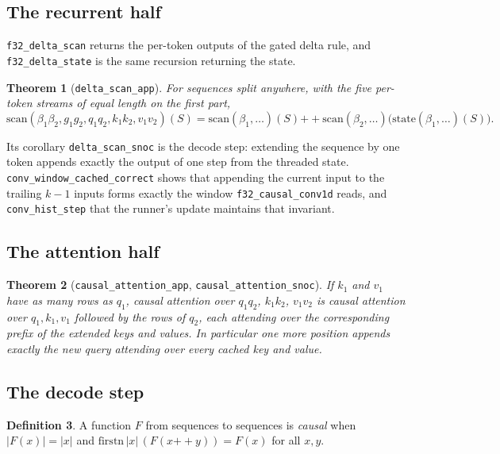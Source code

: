 \documentclass[11pt]{article}
\theoremstyle{plain}
\newtheorem{theorem}{Theorem}[section]
\theoremstyle{definition}
\newtheorem{definition}[theorem]{Definition}
\newcommand{\code}[1]{\texttt{#1}}
\begin{document}
\subsection{The recurrent half}

\code{f32\_delta\_scan} returns the per-token outputs of the gated delta rule,
and \code{f32\_delta\_state} is the same recursion returning the state.

\begin{theorem}[\code{delta\_scan\_app}]
For sequences split anywhere, with the five per-token streams of equal length on
the first part,
\[
  \mathrm{scan}(\beta_1\beta_2, g_1g_2, q_1q_2, k_1k_2, v_1v_2)(S)
  = \mathrm{scan}(\beta_1,\dots)(S)
    \mathbin{+\!\!+} \mathrm{scan}(\beta_2,\dots)\big(\mathrm{state}(\beta_1,\dots)(S)\big).
\]
\end{theorem}

Its corollary \code{delta\_scan\_snoc} is the decode step: extending the
sequence by one token appends exactly the output of one step from the threaded
state. \code{conv\_window\_cached\_correct} shows that
appending the current input to the trailing $k-1$ inputs forms exactly the
window \code{f32\_causal\_conv1d} reads, and \code{conv\_hist\_step} that the
runner's update maintains that invariant.

\subsection{The attention half}

\begin{theorem}[\code{causal\_attention\_app}, \code{causal\_attention\_snoc}]
If $k_1$ and $v_1$ have as many rows as $q_1$, causal attention over
$q_1q_2$, $k_1k_2$, $v_1v_2$ is causal attention over $q_1, k_1, v_1$ followed
by the rows of $q_2$, each attending over the corresponding prefix of the
extended keys and values. In particular one more position appends exactly the
new query attending over every cached key and value.
\end{theorem}

\subsection{The decode step}

\begin{definition}
A function $F$ from sequences to sequences is \emph{causal} when
$|F(x)| = |x|$ and $\mathrm{firstn}\,|x|\,(F(x \mathbin{+\!\!+} y)) = F(x)$ for
all $x, y$.
\end{definition}
\end{document}
